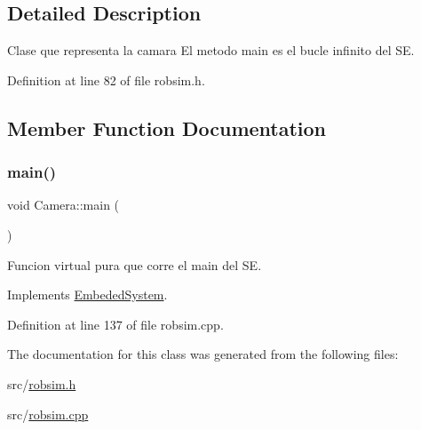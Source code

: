 \subsection{Detailed Description}
Clase que representa la camara El metodo main es el bucle infinito del SE. 

Definition at line 82 of file robsim.\+h.



\subsection{Member Function Documentation}
\mbox{\label{classCamera_a1719371e1e57ad18abfa5dd3d971bb39}} 
\subsubsection{\texorpdfstring{main()}{main()}}
{\footnotesize\ttfamily void Camera\+::main (\begin{DoxyParamCaption}{ }\end{DoxyParamCaption})\hspace{0.3cm}{\ttfamily [virtual]}}



Funcion virtual pura que corre el main del SE. 



Implements \hyperlink{classEmbededSystem_a3a333d4954af4068f5e97301b4f55c48}{Embeded\+System}.



Definition at line 137 of file robsim.\+cpp.



The documentation for this class was generated from the following files\+:\begin{DoxyCompactItemize}
\item 
src/\hyperlink{robsim_8h}{robsim.\+h}\item 
src/\hyperlink{robsim_8cpp}{robsim.\+cpp}\end{DoxyCompactItemize}
